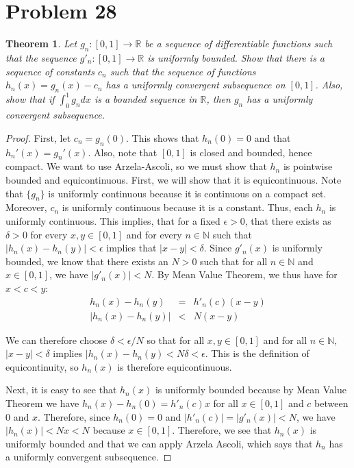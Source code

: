 \documentclass[psamsfonts]{amsart}
\newtheorem{thm}{Theorem}[section]
\theoremstyle{definition}
\theoremstyle{remark}
\numberwithin{equation}{section}
\begin{document}
\section{Problem 28}

\begin{thm}
Let $g_n: [0,1] \to \mathbb{R}$ be a sequence of differentiable functions such that the sequence $g'_n: [0,1] \to \mathbb{R}$ is uniformly bounded. Show that there is a sequence of constants $c_n$ such that the sequence of functions $h_n(x) = g_n(x) - c_n$ has a uniformly convergent subsequence on $[0,1]$. Also, show that if $\int_0^1 g_n dx$ is a bounded sequence in $\mathbb{R}$, then $g_n$ has a uniformly convergent subsequence.
\end{thm}

\begin{proof}
First, let $c_n = g_n(0)$. This shows that $h_n(0) = 0$ and that $h_n'(x) = g_n'(x)$. Also, note that $[0,1]$ is closed and bounded, hence compact. We want to use Arzela-Ascoli, so we must show that $h_n$ is pointwise bounded and equicontinuous. First, we will show that it is equicontinuous. Note that $\{ g_n \}$ is uniformly continuous because it is continuous on a compact set. Moreover, $c_n$ is uniformly continuous because it is a constant. Thus, each $h_n$ is uniformly continuous. This implies, that for a fixed $\epsilon > 0$, that there exists as $\delta > 0$ for every $x,y \in [0,1]$ and for every $n \in \mathbb{N}$ such that $|h_n(x) - h_n(y) | < \epsilon$ implies that $|x - y| < \delta$. Since $g'_n(x)$ is uniformly bounded, we know that there exists an $N > 0$ such that for all $n \in \mathbb{N}$ and $x \in [0,1]$, we have $|g'_n(x) | < N$. By Mean Value Theorem, we thus have for $x < c <y$:
\begin{eqnarray}
h_n(x) - h_n(y) &=& h'_n(c) (x - y)\\
|h_n(x) - h_n(y)| &<& N (x - y)
\end{eqnarray}

We can therefore choose $\delta < \epsilon/N$ so that for all $x,y \in [0,1]$ and for all $n \in \mathbb{N}$, $|x - y| < \delta$ implies $|h_n(x) - h_n(y) < N \delta < \epsilon$. This is the definition of equicontinuity, so $h_n(x)$ is therefore equicontinuous. 

Next, it is easy to see that $h_n(x)$ is uniformly bounded because by Mean Value Theorem we have $h_n(x) - h_n(0) = h'_n(c) x$ for all $x \in [0,1]$ and $c$ between 0 and $x$. Therefore, since $h_n(0) = 0$ and $|h'_n(c)| = |g'_n(x) |< N$, we have $|h_n(x)| < N x < N$ because $x \in [0,1]$. Therefore, we see that $h_n(x)$ is uniformly bounded and that we can apply Arzela Ascoli, which says that $h_n$ has a uniformly convergent subsequence. 


\end{proof}
\end{document}
